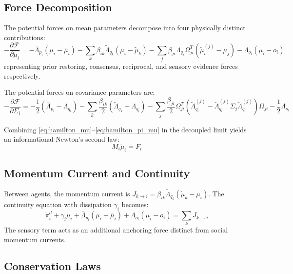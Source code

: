 \documentclass[11pt]{article}
\begin{document}
\subsection{Force Decomposition}

The potential forces on mean parameters decompose into four physically distinct contributions:
\begin{equation}
-\frac{\partial \mathcal{F}}{\partial \mu_i} = -\bar{\Lambda}_{p_i}(\mu_i - \bar{\mu}_i) - \sum_k \beta_{ik}\tilde{\Lambda}_{q_k}(\mu_i - \tilde{\mu}_k) - \sum_j \beta_{ji}\Lambda_{q_i}\Omega_{ji}^T(\tilde{\mu}_i^{(j)} - \mu_j) - \Lambda_{o_i}(\mu_i - o_i)
\label{eq:force_decomposition}
\end{equation}
representing prior restoring, consensus, reciprocal, and sensory evidence forces respectively.

The potential forces on covariance parameters are:
\begin{equation}
-\frac{\partial \mathcal{F}}{\partial \Sigma_i} = -\frac{1}{2}(\bar{\Lambda}_{p_i} - \Lambda_{q_i}) - \sum_k \frac{\beta_{ik}}{2}(\tilde{\Lambda}_{q_k} - \Lambda_{q_i}) - \sum_j \frac{\beta_{ji}}{2}\Omega_{ji}^T(\tilde{\Lambda}_{q_i}^{(j)} - \tilde{\Lambda}_{q_i}^{(j)}\Sigma_j\tilde{\Lambda}_{q_i}^{(j)})\Omega_{ji} - \frac{1}{2}\Lambda_{o_i}
\end{equation}

Combining \eqref{eq:hamilton_mu}--\eqref{eq:hamilton_pi_mu} in the decoupled limit yields an informational Newton's second law:
\begin{equation}
\boxed{M_i \ddot{\mu}_i = F_i}
\label{eq:newton}
\end{equation}

\subsection{Momentum Current and Continuity}

Between agents, the momentum current is $J_{k \to i} = \beta_{ik}\tilde{\Lambda}_{q_k}(\tilde{\mu}_k - \mu_i)$. The continuity equation with dissipation $\gamma_i$ becomes:
\begin{equation}
\dot{\pi}_i^\mu + \gamma_i \dot{\mu}_i + \bar{\Lambda}_{p_i}(\mu_i - \bar{\mu}_i) + \Lambda_{o_i}(\mu_i - o_i) = \sum_k J_{k \to i}
\end{equation}
The sensory term acts as an additional anchoring force distinct from social momentum currents.

\subsection{Conservation Laws}
\end{document}
